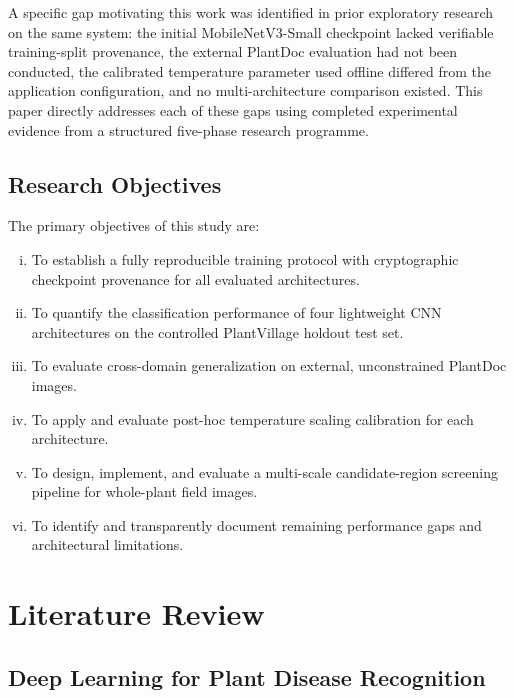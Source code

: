 \documentclass[pdflatex,sn-mathphys-num]{sn-jnl}
\begin{document}
A specific gap motivating this work was identified in prior exploratory research on the
same system: the initial MobileNetV3-Small checkpoint lacked verifiable training-split
provenance, the external PlantDoc evaluation had not been conducted, the calibrated
temperature parameter used offline differed from the application configuration, and no
multi-architecture comparison existed. This paper directly addresses each of these gaps
using completed experimental evidence from a structured five-phase research programme.

\subsection{Research Objectives}
\label{sec:objectives}

The primary objectives of this study are:
\begin{enumerate}[(i)]
  \item To establish a fully reproducible training protocol with cryptographic checkpoint
        provenance for all evaluated architectures.
  \item To quantify the classification performance of four lightweight CNN architectures
        on the controlled PlantVillage holdout test set.
  \item To evaluate cross-domain generalization on external, unconstrained PlantDoc images.
  \item To apply and evaluate post-hoc temperature scaling calibration for each architecture.
  \item To design, implement, and evaluate a multi-scale candidate-region screening
        pipeline for whole-plant field images.
  \item To identify and transparently document remaining performance gaps and
        architectural limitations.
\end{enumerate}


\section{Literature Review}
\label{sec:literature_review}

\subsection{Deep Learning for Plant Disease Recognition}
\end{document}
